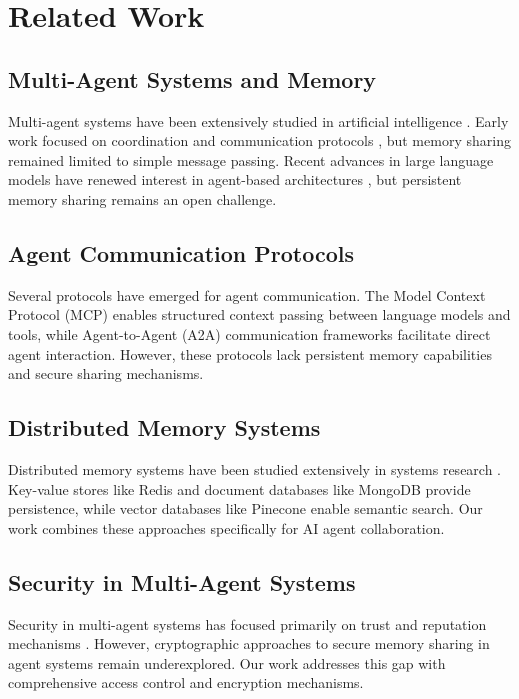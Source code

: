 \documentclass[11pt]{article}
\begin{document}
\section{Related Work}

\subsection{Multi-Agent Systems and Memory}

Multi-agent systems have been extensively studied in artificial intelligence \citep{stone2000multiagent}. Early work focused on coordination and communication protocols \citep{fipa2002agent}, but memory sharing remained limited to simple message passing. Recent advances in large language models have renewed interest in agent-based architectures \citep{xi2023rise}, but persistent memory sharing remains an open challenge.

\subsection{Agent Communication Protocols}

Several protocols have emerged for agent communication. The Model Context Protocol (MCP) \citep{anthropic2024mcp} enables structured context passing between language models and tools, while Agent-to-Agent (A2A) communication frameworks \citep{autogen2023} facilitate direct agent interaction. However, these protocols lack persistent memory capabilities and secure sharing mechanisms.

\subsection{Distributed Memory Systems}

Distributed memory systems have been studied extensively in systems research \citep{tanenbaum2007distributed}. Key-value stores like Redis \citep{redis2024} and document databases like MongoDB \citep{mongodb2024} provide persistence, while vector databases like Pinecone \citep{pinecone2024} enable semantic search. Our work combines these approaches specifically for AI agent collaboration.

\subsection{Security in Multi-Agent Systems}

Security in multi-agent systems has focused primarily on trust and reputation mechanisms \citep{ramchurn2004trust}. However, cryptographic approaches to secure memory sharing in agent systems remain underexplored. Our work addresses this gap with comprehensive access control and encryption mechanisms.
\end{document}
